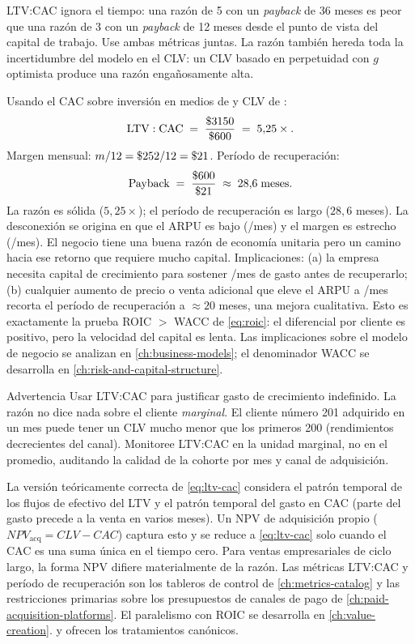LTV:CAC ignora el tiempo: una razón de 5 con un \emph{payback} de 36 meses es peor que una razón de 3 con un \emph{payback} de 12 meses desde el punto de vista del capital de trabajo. Use ambas métricas juntas. La razón también hereda toda la incertidumbre del modelo en el CLV: un CLV basado en perpetuidad con \(g\) optimista produce una razón engañosamente alta.

\begin{example}
Usando el CAC sobre inversión en medios de  y CLV de :
\[
  \mathrm{LTV:CAC} \;=\; \frac{\$\num{3150}}{\$\num{600}} \;=\; 5{,}25\times .
\]
Margen mensual: \(m/12 = \$\num{252}/12 = \$\num{21}\). Período de recuperación:
\[
  \mathrm{Payback} \;=\; \frac{\$\num{600}}{\$\num{21}} \;\approx\; 28{,}6 \;\text{meses}.
\]
La razón es sólida (\(5{,}25\times\)); el período de recuperación es largo (\(28{,}6\) meses). La desconexión se origina en que el ARPU es bajo (/mes) y el margen es estrecho (/mes). El negocio tiene una buena razón de economía unitaria pero un camino hacia ese retorno que requiere mucho capital. Implicaciones: (a) la empresa necesita capital de crecimiento para sostener /mes de gasto antes de recuperarlo; (b) cualquier aumento de precio o venta adicional que eleve el ARPU a /mes recorta el período de recuperación a \(\approx 20\) meses, una mejora cualitativa. Esto es exactamente la prueba ROIC \(>\) WACC de \cref{eq:roic}: el diferencial por cliente es positivo, pero la velocidad del capital es lenta. Las implicaciones sobre el modelo de negocio se analizan en \cref{ch:business-models}; el denominador WACC se desarrolla en \cref{ch:risk-and-capital-structure}.
\end{example}

\begin{admonition}{Advertencia}
Usar LTV:CAC para justificar gasto de crecimiento indefinido. La razón no dice nada sobre el cliente \emph{marginal}. El cliente número 201 adquirido en un mes puede tener un CLV mucho menor que los primeros 200 (rendimientos decrecientes del canal). Monitoree LTV:CAC en la unidad marginal, no en el promedio, auditando la calidad de la cohorte por mes y canal de adquisición.
\end{admonition}

La versión teóricamente correcta de \cref{eq:ltv-cac} considera el patrón temporal de los flujos de efectivo del LTV y el patrón temporal del gasto en CAC (parte del gasto precede a la venta en varios meses). Un NPV de adquisición propio (\(NPV_{\text{acq}} = CLV - CAC\)) captura esto y se reduce a \cref{eq:ltv-cac} solo cuando el CAC es una suma única en el tiempo cero. Para ventas empresariales de ciclo largo, la forma NPV difiere materialmente de la razón. Las métricas LTV:CAC y período de recuperación son los tableros de control de \cref{ch:metrics-catalog} y las restricciones primarias sobre los presupuestos de canales de pago de \cref{ch:paid-acquisition-platforms}. El paralelismo con ROIC se desarrolla en \cref{ch:value-creation}. \textcite{gupta2004customer} y \textcite{bendle2020marketing} ofrecen los tratamientos canónicos.

